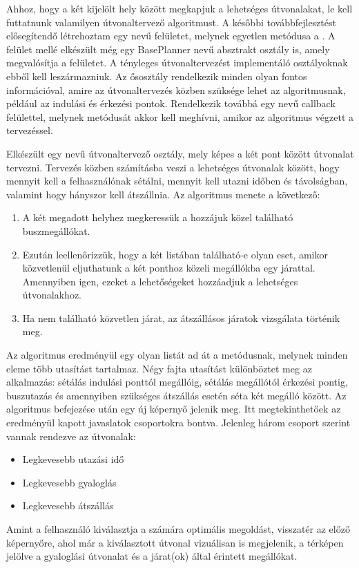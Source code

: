 Ahhoz, hogy a két kijelölt hely között megkapjuk a lehetséges útvonalakat, le kell futtatnunk valamilyen útvonaltervező algoritmust.
A későbbi továbbfejlesztést elősegítendő létrehoztam egy  nevű felületet, melynek egyetlen metódusa a .
A felület mellé elkészült még egy BasePlanner nevű absztrakt osztály is, amely megvalósítja a felületet.
A tényleges útvonaltervezést implementáló osztályoknak ebből kell leszármazniuk.
Az ősosztály rendelkezik minden olyan fontos információval, amire az útvonaltervezés közben szüksége lehet az algoritmusnak, például az indulási és érkezési pontok. 
Rendelkezik továbbá egy  nevű callback felülettel, melynek  metódusát akkor kell meghívni, amikor az algoritmus végzett a tervezéssel.

Elkészült egy  nevű útvonaltervező osztály, mely képes a két pont között útvonalat tervezni.
Tervezés közben számításba veszi a lehetséges útvonalak között, hogy mennyit kell a felhasználónak sétálni, mennyit kell utazni időben és távolságban, valamint hogy hányszor kell átszállnia.
Az algoritmus menete a következő:
\begin{enumerate}
	\item A két megadott helyhez megkeressük a hozzájuk közel található buszmegállókat.
	\item Ezután leellenőrizzük, hogy a két listában található-e olyan eset, amikor közvetlenül eljuthatunk a két ponthoz közeli megállókba egy járattal. 
	Amennyiben igen, ezeket a lehetőségeket hozzáadjuk a lehetséges útvonalakhoz.
	\item Ha nem található közvetlen járat, az átszállásos járatok vizsgálata történik meg.
\end{enumerate}

Az algoritmus eredményül egy olyan listát ad át a  metódusnak, melynek minden eleme több utasítást tartalmaz.
Négy fajta utasítást különböztet meg az alkalmazás: sétálás indulási ponttól megállóig, sétálás megállótól érkezési pontig, buszutazás és amennyiben szükséges átszállás esetén séta két megálló között.
Az algoritmus befejezése után egy új képernyő jelenik meg.
Itt megtekinthetőek az eredményül kapott javaslatok csoportokra bontva.
Jelenleg három csoport szerint vannak rendezve az útvonalak:
\begin{itemize}
	\item Legkevesebb utazási idő
	\item Legkevesebb gyaloglás
	\item Legkevesebb átszállás
\end{itemize}

Amint a felhasználó kiválasztja a számára optimális megoldást, visszatér az előző képernyőre, ahol már a kiválasztott útvonal vizuálisan is megjelenik, a térképen jelölve a gyaloglási útvonalat és a járat(ok) által érintett megállókat.
\newpage